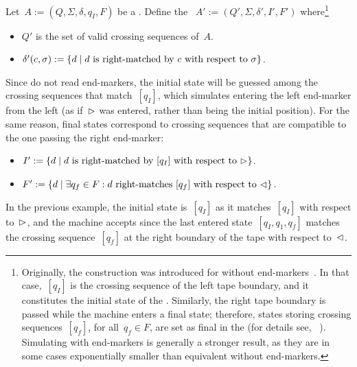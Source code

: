 Let~$A:=(Q,\Sigma,\delta,q_I,F)$ be a \TDFA.
Define the \ONFA~$A':=(Q',\Sigma,\delta',I',F')$ where\footnote{%
	Originally, the construction was introduced for \TDFAs without end-markers~\cite{RabSco59}.
	In that case,~$[q_I]$ is the crossing sequence of the left tape boundary, and it constitutes the initial state of the \ONFA.
	Similarly, the right tape boundary is passed while the machine enters a final state; therefore, states storing crossing sequences~$[q_f]$, for all~$q_f\in F$, are set as final in the \ONFA (for details see, \eg[,]~\cite{HopUll79}).
	Simulating \TDFAs with end-markers is generally a stronger result, as they are in some cases exponentially smaller than equivalent \TDFAs without end-markers.
}
\begin{itemize}
	\item $Q'$ is the set of valid crossing sequences of~$A$.
	\item $\delta'(c,\sigma):=\{d \mid \text{$d$ is right-matched by~$c$ with respect to~$\sigma$}\}$.
\end{itemize}
Since \ONFAs do not read end-markers, the initial state will be guessed among the crossing sequences that match~$[q_I]$, which simulates entering the left end-marker from the left (as if~$\rhd$ was entered, rather than being the initial position).
For the same reason, final states correspond to crossing sequences that are compatible to the one passing the right end-marker:
\begin{itemize}
	\item $I':=\{d\mid \text{$d$ is right-matched by~$[q_I]$ with respect to~$\rhd$}\}$.
	\item $F':=\{d\mid \exists q_f\in F: \text{$d$ right-matches~$[q_f]$ with respect to~$\lhd$}\}$.
\end{itemize}
In the previous example, the initial state is~$[q_I]$ as it matches~$[q_I]$ with respect to~$\rhd$, and the machine accepts since the last entered state~$[q_I,q_1,q_f]$ matches the crossing sequence~$[q_f]$ at the right boundary of the tape with respect to~$\lhd$.

